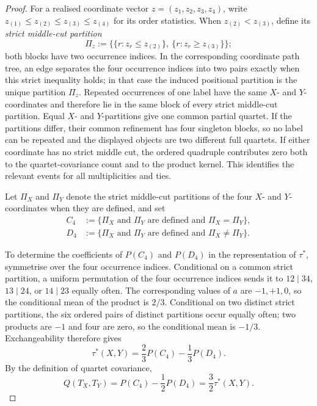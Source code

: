 \documentclass[pdflatex,sn-mathphys-num]{sn-jnl}
\theoremstyle{thmstyleone}
\begin{document}
\begin{proof}
For a realised coordinate vector $z=(z_1,z_2,z_3,z_4)$, write
$z_{(1)}\le z_{(2)}\le z_{(3)}\le z_{(4)}$ for its order statistics.  When
$z_{(2)}<z_{(3)}$, define its \emph{strict middle-cut partition}
\[
\Pi_z:=
\bigl\{\{r:z_r\le z_{(2)}\},\ \{r:z_r\ge z_{(3)}\}\bigr\};
\]
both blocks have two occurrence indices.  In the corresponding coordinate
path tree, an edge separates the four occurrence indices into two pairs
exactly when this strict inequality holds; in that case the induced positional
partition is the unique partition $\Pi_z$.  Repeated
occurrences of one label have the same $X$- and $Y$-coordinates and therefore
lie in the same block of every strict middle-cut partition.  Equal $X$- and
$Y$-partitions give one common partial quartet.  If the partitions differ,
their common refinement has four singleton blocks, so no label can be repeated
and the displayed objects are two different full quartets.  If either
coordinate has no strict middle cut, the ordered quadruple contributes zero
both to the quartet-covariance count and to the product kernel.  This identifies
the relevant events for all multiplicities and ties.

Let $\Pi_X$ and $\Pi_Y$ denote the strict middle-cut partitions of the four
$X$- and $Y$-coordinates when they are defined, and set
\begin{align*}
C_4&:=\{\Pi_X\text{ and }\Pi_Y\text{ are defined and }\Pi_X=\Pi_Y\},\\
D_4&:=\{\Pi_X\text{ and }\Pi_Y\text{ are defined and }\Pi_X\ne\Pi_Y\}.
\end{align*}

To determine the coefficients of $P(C_4)$ and $P(D_4)$ in the representation
of $\tau^*$, symmetrise over the four occurrence indices.  Conditional on a common
strict partition, a uniform permutation of the four occurrence indices
sends it to $12\mid34$, $13\mid24$, or $14\mid23$ equally often.  The
corresponding values of $a$ are $-1,+1,0$, so the conditional mean of the
product is $2/3$.  Conditional on two distinct strict partitions, the
six ordered pairs of distinct partitions occur equally often; two
products are $-1$ and four are zero, so the conditional mean is $-1/3$.
Exchangeability therefore gives
\[
\tau^*(X,Y)=\frac23P(C_4)-\frac13P(D_4).
\]
By the definition of quartet covariance,
\begin{equation}\label{eq:path-Q-tau-star}
Q(T_X,T_Y)=P(C_4)-\frac12P(D_4)=\frac32\tau^*(X,Y).
\end{equation}


\end{proof}
\end{document}
